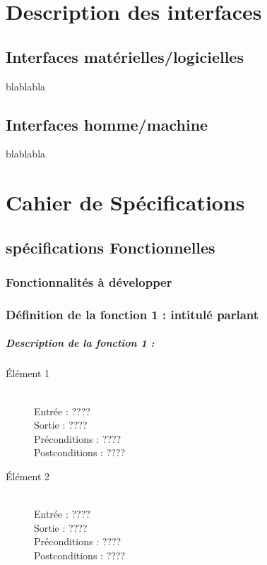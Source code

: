 \documentclass{polytech/polytech}
\numberwithin{figure}{chapter}
\begin{document}
\begin{appendix}
\chapter{Description des interfaces}

\section{Interfaces matérielles/logicielles}

blablabla

\section{Interfaces homme/machine}

blablabla

\chapter{Cahier de Spécifications}

\section{spécifications Fonctionnelles}

\subsection{Fonctionnalités à développer}



\subsection{ Définition de la fonction 1 : intitulé parlant}

\paragraph{Description de la fonction 1 :}
 
\begin{description}
    \item[Élément 1] ~ \\
        Entrée : ???? \\
        Sortie : ???? \\
        Préconditions : ???? \\
        Postconditions : ????
    \item[Élément 2] ~ \\
        Entrée : ???? \\
        Sortie : ???? \\
        Préconditions : ???? \\
        Postconditions : ????
\end{description}


\end{appendix}
\end{document}
